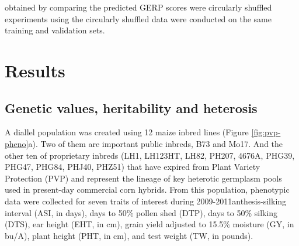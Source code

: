 \documentclass[9pt,twocolumn,twoside]{gsajnl}
\begin{document}
\DIFaddend obtained by comparing the predicted \DIFdelbegin {}
\DIFdelend \DIFaddbegin {}\DIFaddend GERP scores were circularly shuffled \DIFdelbegin {}\DIFdelend \DIFaddbegin {}\DIFaddend experiments using the circularly shuffled data were conducted on the same training and validation sets.  


\DIFdelbegin \subsection*{}
\DIFdelend 


\DIFdelbegin \textit{} 
\DIFdelend \section*{Results}


\subsection*{Genetic values, heritability and heterosis\DIFdelbegin {}\DIFdelend }

A \DIFdelbegin {}\DIFdelend \DIFaddbegin {}\DIFaddend diallel population was created using 12 maize inbred lines (Figure \ref{fig:pvp-pheno}a). 
Two of them are important public inbreds, B73 and Mo17. And the other ten of \DIFdelbegin {}\DIFdelend proprietary inbreds (LH1, LH123HT, LH82, PH207, 4676A, PHG39, PHG47, PHG84, PHJ40, PHZ51) that have expired from Plant Variety Protection (PVP) and represent \DIFaddbegin {}\DIFaddend the lineage of key heterotic germplasm pools used in present-day commercial corn hybrids. 
\DIFdelbegin {}\DIFdelend From this population, phenotypic data were collected for seven traits of interest during 2009-2011\DIFdelbegin {}\DIFdelend \DIFaddbegin \DIFadd{: }\DIFaddend anthesis-silking interval (ASI, in days), days to 50\% pollen shed (DTP), days to 50\% silking (DTS), ear height (EHT, in cm), grain yield adjusted to 15.5\% moisture (GY, in bu/A), plant height (PHT, in cm), and test weight (TW, in pounds).
\end{document}
